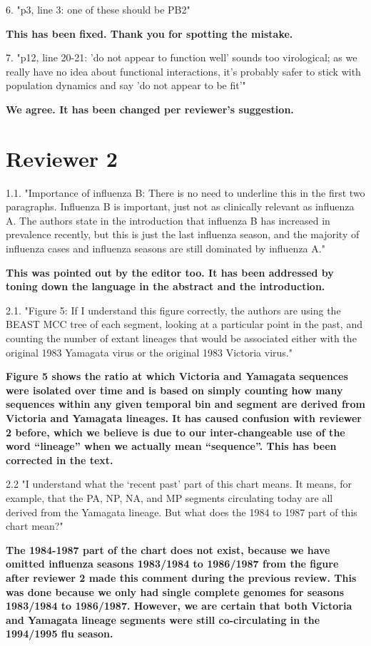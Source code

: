 \documentclass[11pt,oneside,letterpaper]{article}
\begin{document}
6. "p3, line 3: one of these should be PB2"

\textbf{This has been fixed. Thank you for spotting the mistake.}

7. "p12, line 20-21: 'do not appear to function well' sounds too virological; as we really have no idea about functional interactions, it's probably safer to stick with population dynamics and say 'do not appear to be fit'"

\textbf{We agree. It has been changed per reviewer's suggestion.}

\section*{Reviewer 2}

1.1. "Importance of influenza B: There is no need to underline this in the first two paragraphs.
Influenza B is important, just not as clinically relevant as influenza A.
The authors state in the introduction that influenza B has increased in prevalence recently, but this is just the last influenza season, and the majority of influenza cases and influenza seasons are still dominated by influenza A."

\textbf{This was pointed out by the editor too.
It has been addressed by toning down the language in the abstract and the introduction.}

2.1. "Figure 5: If I understand this figure correctly, the authors are using the BEAST MCC tree of each segment, looking at a particular point in the past, and counting the number of extant lineages that would be associated either with the original 1983 Yamagata virus or the original 1983 Victoria virus."

\textbf{Figure 5 shows the ratio at which Victoria and Yamagata sequences were isolated over time and is based on simply counting how many sequences within any given temporal bin and segment are derived from Victoria and Yamagata lineages.
It has caused confusion with reviewer 2 before, which we believe is due to our inter-changeable use of the word ``lineage'' when we actually mean ``sequence''.
This has been corrected in the text.}

2.2 "I understand what the `recent past' part of this chart means.
It means, for example, that the PA, NP, NA, and MP segments circulating today are all derived from the Yamagata lineage.
But what does the 1984 to 1987 part of this chart mean?"

\textbf{The 1984-1987 part of the chart does not exist, because we have omitted influenza seasons 1983/1984 to 1986/1987 from the figure after reviewer 2 made this comment during the previous review.
This was done because we only had single complete genomes for seasons 1983/1984 to 1986/1987.
However, we are certain that both Victoria and Yamagata lineage segments were still co-circulating in the 1994/1995 flu season.}
\end{document}
